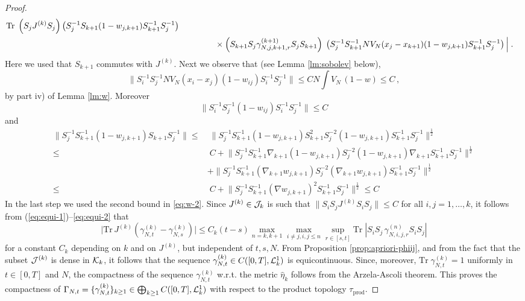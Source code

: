 \documentclass[11pt]{article}
\newcommand{\be}{\begin{equation}}
\newcommand{\ee}{\end{equation}}
\newcommand{\tr}{\mbox{Tr}}
\newcommand{\wh}{\widehat}
\newcommand{\cK}{{\cal K}}
\newcommand{\cL}{{\cal L}}
\newcommand{\cJ}{{\cal J}}
\begin{document}
\begin{proof}
\begin{equation}
\begin{split}
\tr \; \left(S_j J^{(k)} S_j\right) \left(S_j^{-1} S_{k+1}
(1-w_{j,k+1}) S_{k+1}^{-1} S_j^{-1}\right) \\ &\hspace{1.5cm} \times
\left(S_{k+1} S_j  \gamma^{(k+1)}_{N,j,k+1,r} S_j S_{k+1}\right) \;
\left(S_j^{-1} S_{k+1}^{-1} N V_N (x_j - x_{k+1}) (1- w_{j,k+1})
S_{k+1}^{-1} S_j^{-1}\right)\Big|\; .
\end{split}
\end{equation}
Here we used that $S_{k+1}$
commutes with $J^{(k)}$. Next we observe that (see Lemma
\ref{lm:sobolev} below),
\begin{equation}
\| S_i^{-1} S_j^{-1} N V_N (x_i - x_j) (1-w_{ij}) S_i^{-1} S_j^{-1}
\| \leq C N \int  V_N \, (1-w) \leq C \,,
\end{equation}
by part iv) of Lemma \ref{lm:w}. Moreover
\begin{equation}
\| S_i^{-1} S_j^{-1} (1- w_{ij}) S_i^{-1} S_j^{-1} \| \leq C
\end{equation}
and \be\label{eq:equi-2}
\begin{split}
\| S_j^{-1} S_{k+1}^{-1} (1- w_{j,k+1}) S_{k+1} S_j^{-1} \|
\leq & \;  \Big\| S_j^{-1} S_{k+1}^{-1} (1- w_{j,k+1}) S_{k+1}^2 S_j^{-2}
 (1- w_{j,k+1}) S_{k+1}^{-1} S_j^{-1}\Big\|^{\frac{1}{2}} \\
\leq & \; C + \Big\| S_j^{-1} S_{k+1}^{-1} \nabla_{k+1}
  (1- w_{j,k+1})  S_j^{-2}
 (1- w_{j,k+1})  \nabla_{k+1} S_{k+1}^{-1} S_j^{-1}\Big\|^{\frac{1}{2}} \\
& +  \Big\| S_j^{-1} S_{k+1}^{-1} (\nabla_{k+1} w_{j,k+1}) S_j^{-2}
 (\nabla_{k+1} w_{j,k+1}) S_{k+1}^{-1} S_j^{-1}\Big\|^{\frac{1}{2}} \\
\leq & \; C + \Big\| S_j^{-1} S_{k+1}^{-1} (\nabla w_{j,k+1})^2
  S_{k+1}^{-1} S_j^{-1}\Big\|^{\frac{1}{2}} \leq C
\end{split}
\ee In the last step we used  the second bound in
\eqref{eq:w-2}. Since $J^{(k)} \in \cJ_k$ is such that $\| S_i S_j
J^{(k)} S_i S_j \| \leq C$ for all $i,j=1, \dots ,k$, it follows
from (\ref{eq:equi-1})--\eqref{eq:equi-2} that
\begin{equation}
\Big| \tr \, J^{(k)} \left(  \gamma_{N,t}^{(k)} - \gamma_{N,s}^{(k)}
\right) \Big| \leq C_k (t-s) \max_{n=k,k+1} \max_{i\neq j, i,j \leq
n} \sup_{r \in [s,t]} \tr \; \left| S_i S_j \,
\gamma_{N,i,j,r}^{(n)} S_i S_j \right|
\end{equation}
for a constant $C_k$ depending on $k$ and on $J^{(k)}$, but
independent of $t,s,N$. {F}rom Proposition \ref{prop:apriori-phiij},
and from the fact that
 the subset $\cJ^{(k)}$ is dense in $\cK_k$, it follows
that the sequence $ \gamma_{N,t}^{(k)} \in C([0,T], \cL^1_k)$ is
equicontinuous. Since, moreover, $\tr \;  \gamma^{(k)}_{N,t} =1$
uniformly in $t \in [0,T]$ and $N$, the compactness of the sequence
$ \gamma^{(k)}_{N,t}$ w.r.t. the metric $\wh \eta_k$ follows from
the Arzela-Ascoli theorem.  This proves the compactness of $
\Gamma_{N,t} = \{  \gamma^{(k)}_{N,t} \}_{k \geq 1} \in \bigoplus_{k
\geq 1} C([0,T], \cL^1_k)$ with respect to the product topology
$\tau_{\text{prod}}$.


\end{proof}
\end{document}
